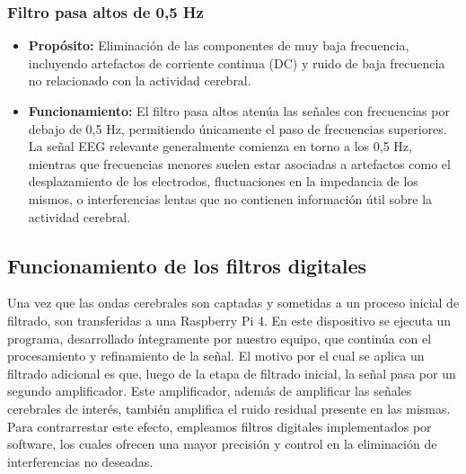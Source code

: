 \documentclass{article}
\begin{document}
\subsubsection{Filtro pasa altos de 0,5 Hz}
\begin{itemize}
    \item \textbf{Propósito:} Eliminación de las componentes de muy baja frecuencia, incluyendo artefactos de corriente continua (DC) y ruido de baja frecuencia no relacionado con la actividad cerebral.
    \item \textbf{Funcionamiento:} El filtro pasa altos atenúa las señales con frecuencias por debajo de 0,5 Hz, permitiendo únicamente el paso de frecuencias superiores. La señal EEG relevante generalmente comienza en torno a los 0,5 Hz, mientras que frecuencias menores suelen estar asociadas a artefactos como el desplazamiento de los electrodos, fluctuaciones en la impedancia de los mismos, o interferencias lentas que no contienen información útil sobre la actividad cerebral.
\end{itemize}

\subsection{Funcionamiento de los filtros digitales}

Una vez que las ondas cerebrales son captadas y sometidas a un proceso inicial de filtrado, son transferidas a una Raspberry Pi 4. En este dispositivo se ejecuta un programa, desarrollado íntegramente por nuestro equipo, que continúa con el procesamiento y refinamiento de la señal. El motivo por el cual se aplica un filtrado adicional es que, luego de la etapa de filtrado inicial, la señal pasa por un segundo amplificador. Este amplificador, además de amplificar las señales cerebrales de interés, también amplifica el ruido residual presente en las mismas. Para contrarrestar este efecto, empleamos filtros digitales implementados por software, los cuales ofrecen una mayor precisión y control en la eliminación de interferencias no deseadas.
\end{document}
